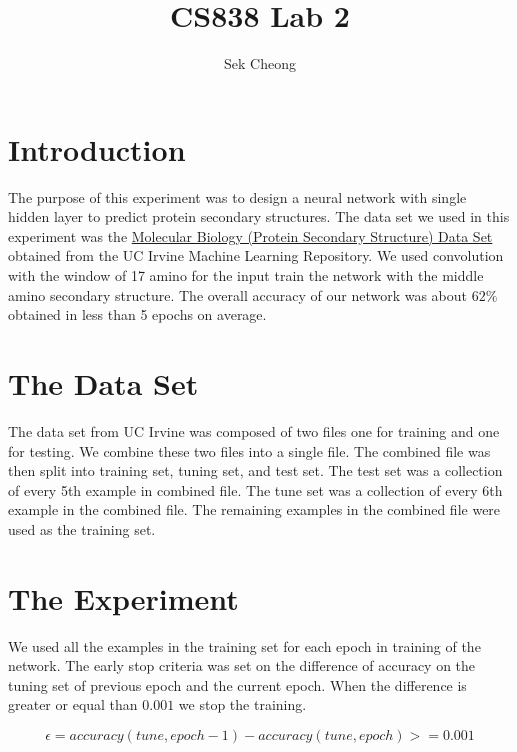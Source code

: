 \documentclass{article}
\begin{document}
\title{CS838 Lab 2}
\author{Sek Cheong}
\maketitle


\section{Introduction}
The purpose of this experiment was to design a neural network with single hidden layer to predict protein secondary structures. The data set we used in this experiment was the \href{https://archive.ics.uci.edu/ml/datasets/Molecular+Biology+(Protein+Secondary+Structure)}{Molecular Biology (Protein Secondary Structure) Data Set} obtained from the UC Irvine Machine Learning Repository. We used convolution with the window of 17 amino for the input train the network with the middle amino secondary structure. The overall accuracy of our network was about $62\%$ obtained in less than 5 epochs on average.

\section{The Data Set}
The data set from UC Irvine was composed of two files one for training and one for testing. We combine these two files into a single file. The combined file was then split into training set, tuning set, and test set.  The test set was a collection of every 5th example in combined file. The tune set was a collection of every 6th example in the combined file. The remaining examples in the combined file were used as the training set. 

\section{The Experiment}
We used all the examples in the training set for each epoch in training of the network. The early stop criteria was set on the difference of accuracy on the tuning set of previous epoch and the current epoch. When the difference is greater or equal than $0.001$ we stop the training.

\begin{equation}
\epsilon = accuracy(tune,epoch-1) - accuracy(tune, epoch) >= 0.001
\end{equation}
\end{document}
